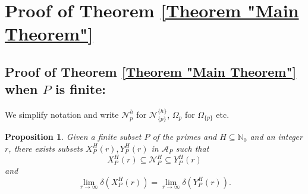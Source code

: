 \documentclass[12pt, a4paper]{amsart}
\newtheorem{proposition}{Proposition}
\theoremstyle{remark}
\theoremstyle{proof}
\numberwithin{equation}{section}
\numberwithin{assumption}{section}
\newcommand{\N}{\mathbb{N}}
\begin{document}
	\section{Proof of Theorem \ref{Theorem "Main Theorem"}}\label{Section "Proof - Main"}
	
	 \subsection{Proof of Theorem \ref{Theorem "Main Theorem"} when $P$ is finite:}
	 
	 We simplify notation and write $\mathcal{N}_p^h$ for $\mathcal{N}_{\{p\}}^{\{h\}}$, $\Omega_{p}$ for $\Omega_{\{p\}}$ etc.	 
	 \begin{proposition}\label{Proposition "Approximation"}
	 	Given a finite subset $P$ of the primes and $H\subseteq \N_0$ and an integer $r$, there exists subsets $X_P^H(r), Y_P^H(r)$ in $\mathcal{A}_P$ such that 
	 	\[
	 	X_P^H(r)\subseteq \mathcal{N}_P^H\subseteq Y_P^H(r)
	 	\]
	 	and 
	 	\[
	 	\lim_{r\to\infty} \delta(X_P^H(r)) = \lim_{r\to\infty} \delta(Y_P^H(r)).
	 	\]
	 \end{proposition}
	
\end{document}
